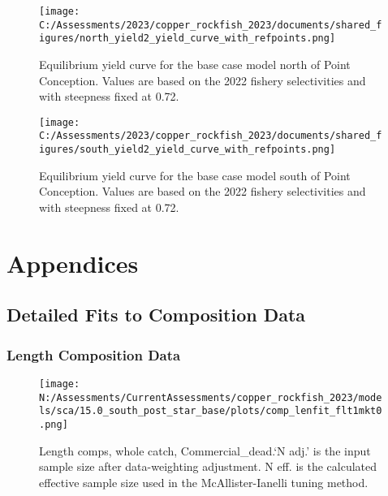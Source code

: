 \documentclass[11pt,
  english,
  letterpaper,
]{article}
\begin{document}
\pagebreak

\begin{figure}
\centering
\texttt{[image: C:/Assessments/2023/copper\_rockfish\_2023/documents/shared\_figures/north\_yield2\_yield\_curve\_with\_refpoints.png]}
\caption{Equilibrium yield curve for the base case model north of Point Conception. Values are based on the 2022 fishery selectivities and with steepness fixed at 0.72.\label{fig:yield-north}}
\end{figure}

\pagebreak

\begin{figure}
\centering
\texttt{[image: C:/Assessments/2023/copper\_rockfish\_2023/documents/shared\_figures/south\_yield2\_yield\_curve\_with\_refpoints.png]}
\caption{Equilibrium yield curve for the base case model south of Point Conception. Values are based on the 2022 fishery selectivities and with steepness fixed at 0.72.\label{fig:yield-south}}
\end{figure}

\pagebreak

\hypertarget{appendices}{%
\section{Appendices}\label{appendices}}

\hypertarget{detailed-fit-comps}{%
\subsection{Detailed Fits to Composition Data}\label{detailed-fit-comps}}

\hypertarget{length-data}{%
\subsubsection{Length Composition Data}\label{length-data}}

\begin{figure}
\centering
\texttt{[image: N:/Assessments/CurrentAssessments/copper\_rockfish\_2023/models/sca/15.0\_south\_post\_star\_base/plots/comp\_lenfit\_flt1mkt0.png]}
\caption{Length comps, whole catch, Commercial\_dead.`N adj.' is the input sample size after data-weighting adjustment. N eff. is the calculated effective sample size used in the McAllister-Ianelli tuning method.\label{fig:comp_lenfit_flt1mkt0}}
\end{figure}
\end{document}
